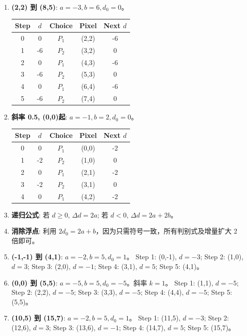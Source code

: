 \documentclass[UTF8]{ctexart}
\begin{document}
\begin{enumerate}
\begin{center}
\begin{tabular}{ccccc}
    \end{tabular}
    \end{center}
    \item \textbf{(2,2) 到 (8,5)}: $a=-3, b=6, d_0=0$。
    \begin{center}
    \begin{tabular}{ccccc}
    \toprule Step & $d$ & Choice & Pixel & Next $d$ \\ \midrule
    0 & 0 & $P_1$ & (2,2) & -6 \\
    1 & -6 & $P_2$ & (3,2) & 0 \\ 2 & 0 & $P_1$ & (4,3) & -6 \\
    3 & -6 & $P_2$ & (5,3) & 0 \\ 4 & 0 & $P_1$ & (6,4) & -6 \\
    5 & -6 & $P_2$ & (7,4) & 0 \\ \bottomrule
    \end{tabular}
    \end{center}
    \item \textbf{斜率 0.5, (0,0)起}: $a=-1, b=2, d_0=0$。
    \begin{center}
    \begin{tabular}{ccccc}
    \toprule Step & $d$ & Choice & Pixel & Next $d$ \\ \midrule
    0 & 0 & $P_1$ & (0,0) & -2 \\
    1 & -2 & $P_2$ & (1,0) & 0 \\ 2 & 0 & $P_1$ & (2,1) & -2 \\
    3 & -2 & $P_2$ & (3,1) & 0 \\ 4 & 0 & $P_1$ & (4,2) & -2 \\ \bottomrule
    \end{tabular}
    \end{center}
    \item \textbf{递归公式}: 若 $d \ge 0$, $\Delta d = 2a$; 若 $d < 0$, $\Delta d = 2a+2b$。
    \item \textbf{消除浮点}: 利用 $2d_0 = 2a+b$，因为只需符号一致，所有判别式及增量扩大 2 倍即可。
    \item \textbf{(-1,-1) 到 (4,1)}: $a=-2, b=5, d_0=1$。
    Step 1: (0,-1), $d=-3$; Step 2: (1,0), $d=3$; Step 3: (2,0), $d=-1$; Step 4: (3,1), $d=5$; Step 5: (4,1)。
    \item \textbf{(0,0) 到 (5,5)}: $a=-5, b=5, d_0=-5$。斜率 $k=1$。
    Step 1: (1,1), $d=-5$; Step 2: (2,2), $d=-5$; Step 3: (3,3), $d=-5$; Step 4: (4,4), $d=-5$; Step 5: (5,5)。
    \item \textbf{(10,5) 到 (15,7)}: $a=-2, b=5, d_0=1$。
    Step 1: (11,5), $d=-3$; Step 2: (12,6), $d=3$; Step 3: (13,6), $d=-1$; Step 4: (14,7), $d=5$; Step 5: (15,7)。
\end{enumerate}
\end{document}
